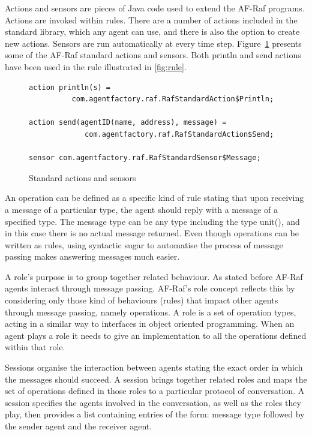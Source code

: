 \documentclass[a4paper,12pt,oneside,fleqn]{book} %
\begin{document}
{Actions and sensors are pieces of Java code used to extend the AF-Raf
programs. Actions are invoked within rules. There are a number of actions
included in the standard library, which any agent can use, and there is also
the option to create new actions. Sensors are run automatically at every time
step. Figure~\ref{fig:actions-sensors} presents some of the AF-Raf standard
actions and sensors. Both {\sf println} and {\sf send} actions have been
used in the rule illustrated in \autoref{fig:rule}.


\begin{figure}\footnotesize %
\begin{verbatim}
action println(s) =
          com.agentfactory.raf.RafStandardAction$Println;

action send(agentID(name, address), message) =
             com.agentfactory.raf.RafStandardAction$Send;

sensor com.agentfactory.raf.RafStandardSensor$Message;
\end{verbatim}
\caption{Standard actions and sensors}
\label{fig:actions-sensors}
\end{figure} %


An operation can be defined as a specific kind of rule stating that upon
receiving a message of a particular type, the agent should reply with a
message of a specified type. The message type can be any type including the
type unit(), and in this case there is no actual message returned. Even
though operations can be written as rules, using syntactic sugar to
automatise the process of message passing makes answering messages much
easier.

A role's purpose is to group together related behaviour. As stated before
AF-Raf agents interact through message passing. AF-Raf's role concept
reflects this by considering only those kind of behaviours (rules) that
impact other agents through message passing, namely operations. A role is a
set of operation types, acting in a similar way to interfaces in object
oriented programming. When an agent plays a role it needs to give an
implementation to all the operations defined within that role.

Sessions organise the interaction between agents stating the exact order in
which the messages should succeed. A session brings together related roles
and maps the set of operations defined in those roles to a particular
protocol of conversation. A session specifies the agents involved in the
conversation, as well as the roles they play, then provides a list
containing entries of the form: message type followed by the sender agent
and the receiver agent.

}
\end{document}
